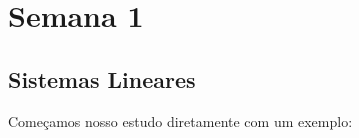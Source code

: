 \documentclass[../livro.tex]{subfiles} %
\begin{document}



\chapter{Semana 1}

\section{Sistemas Lineares}

Começamos nosso estudo diretamente com um exemplo:
\end{document}
